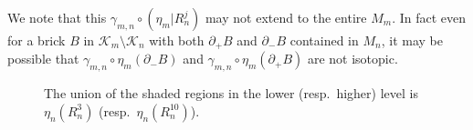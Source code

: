 \documentclass{amsart}
\theoremstyle{definition}
\numberwithin{figure}{section}
\numberwithin{equation}{section}
\def\ck{\mathcal{K}}
\begin{document}
We note that this $\gamma_{m,n} \circ (\eta_m|R^j_n)$ may not extend to the entire $M_m$.
In fact even for a brick $B$ in $\ck_m \setminus \ck_n$ with both $\partial_+B$ and $\partial_- B$ contained in $M_n$, it may be possible that $\gamma_{m,n} \circ \eta_m(\partial_- B)$ and $\gamma_{m,n} \circ \eta_m(\partial_+ B)$ are not isotopic.
\begin{figure}[hbtp]
\centering
{}
\caption{The union of the shaded regions in the lower (resp.\ higher) level 
is $\eta_n(R^3_n)$ (resp.\ $\eta_n(R^{10}_n)$).}
\label{fig2_1}

\end{figure}
\end{document}
